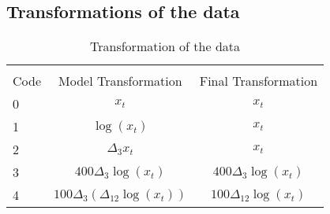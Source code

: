 \documentclass[12pt]{article}
\begin{document}


\subsection{Transformations of the data}

\begin{table}[ht]
	\centering
	\caption{Transformation of the data}
	\begin{tabular}{lcc}
		\hline\\
		Code & Model Transformation & Final Transformation\\ \hline\hline
		0 	& $x_{t}$ & $x_{t}$\\
		1 	& $\log(x_{t})$ & $x_{t}$\\
		2	& $\Delta_{3} x_{t}$ & $x_{t}$\\
		3 	& $400\Delta_{3} \log\left( x_{t} \right)$ &  $400\Delta_{3} \log\left( x_{t} \right)$\\
		4 	& $100\Delta_{3}\left(\Delta_{12}\log(x_{t})\right)$ & $100\Delta_{12}\log(x_{t})$\\ \hline
	\end{tabular}
\end{table}

\FloatBarrier


{}

\end{document}
